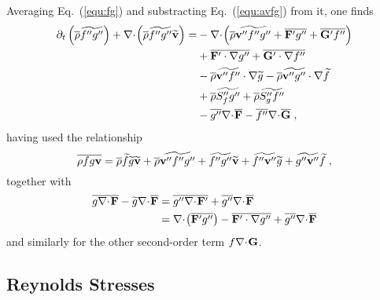 Averaging Eq.~(\ref{equ:fg}) and substracting Eq.~(\ref{equ:avfg}) from it, one finds
\begin{equation}\label{equ:covfg}
  \begin{split}
    \ptp{\avr{\rho} \avf{f''g''}}{t} + \dvp{\avr{\rho} \avf{f''g''}\avf{\mathbf{v}}} =
    &-\dvp{\avr{\rho}\avf{\mathbf{v}''f''g''} + \avr{\mathbf{F}'g''} + \avr{\mathbf{G}'f''}} \\
    &+\avr{\mathbf{F}'\cdot\nabla g''} + \avr{\mathbf{G}'\cdot\nabla f''} \\
    &-\avr{\rho}\avf{\mathbf{v}''f''}\cdot\nabla\avf{g} -\avr{\rho}\avf{\mathbf{v}''g''}\cdot\nabla\avf{f} \\
    &+\avr{\rho}\avf{S''_fg''} +\avr{\rho}\avf{S''_gf''} \\
    &-\avr{g''}\dv{\avr{\mathbf{F}}}-\avr{f''}\dv{\avr{\mathbf{G}}}\;,
  \end{split}
\end{equation}
having used the relationship
\begin{equation}
  \overline{\rho fg\mathbf{v}} = \overline{\rho} \widetilde{f}\widetilde{g}\widetilde{\mathbf{v}}
  + \overline{\rho}\widetilde{\mathbf{v}''f''g''}+ \widetilde{f''g''}\widetilde{\mathbf{v}}
  + \widetilde{f''\mathbf{v}''}\widetilde{g}+ \widetilde{g''\mathbf{v}''}\widetilde{f}\;,
\end{equation}
together with
\begin{equation}
  \begin{split}
    \avr{g\dv{\mathbf{F}}}-\avf{g}\dv{\avr{\mathbf{F}}}
    &= \avr{g''\dv{\mathbf{F}'}}+\avr{g''}\dv{\avr{\mathbf{F}}} \\
    &= \dvp{\avr{\mathbf{F}'g''}}-\avr{\mathbf{F}'\cdot\nabla g''}+\avr{g''}\dv{\avr{\mathbf{F}}}
  \end{split}
\end{equation}
and similarly for the other second-order term $f\nabla\negmedspace\cdot\negthinspace\mathbf{G}$.

\subsection{Reynolds Stresses}

